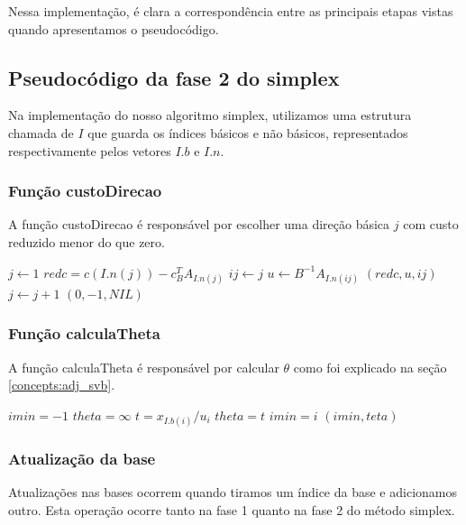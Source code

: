 \documentclass[12pt]{article}
\begin{document}
    Nessa implementação, é clara a correspondência entre as principais etapas vistas quando apresentamos o pseudocódigo.



\subsection{Pseudocódigo da fase 2 do simplex}
Na implementação do nosso algoritmo simplex, utilizamos uma estrutura chamada de $I$ que guarda os índices básicos e não básicos, representados respectivamente pelos vetores $I.b$ e $I.n$.

\subsubsection{Função custoDirecao}
A função custoDirecao é responsável por escolher uma direção básica $j$ com custo reduzido menor do que zero.
\begin{algorithmic}
	\State $j \gets 1$
		\State $redc = c(I.n(j)) - c^T_BA_{I.n(j)}$
			\State $ij \gets j$
			\State $u \gets B^{-1}A_{I.n(ij)}$
			\Return $(redc, u, ij)$
		\EndIf
		\State $j \gets j + 1$		
	\EndWhile
	\Return $(0, -1, NIL)$
\EndFunction
\end{algorithmic}

\subsubsection{Função calculaTheta}
A função calculaTheta é responsável por calcular $\theta$ como foi explicado na seção \ref{concepts:adj_svb}.
\begin{algorithmic}
	\State $imin = -1$
	\State $theta = \infty$
			\State $t = x_{I.b(i)} / u_i$
				\State $theta = t$
				\State $imin = i$
			\EndIf
		\EndIf
	\EndFor
	\Return $(imin, teta)$
\EndFunction
\end{algorithmic}


\subsubsection{Atualização da base}
Atualizações nas bases ocorrem quando tiramos um índice da base e adicionamos outro. Esta operação ocorre tanto na fase 1 quanto na fase 2 do método simplex.
\end{document}
